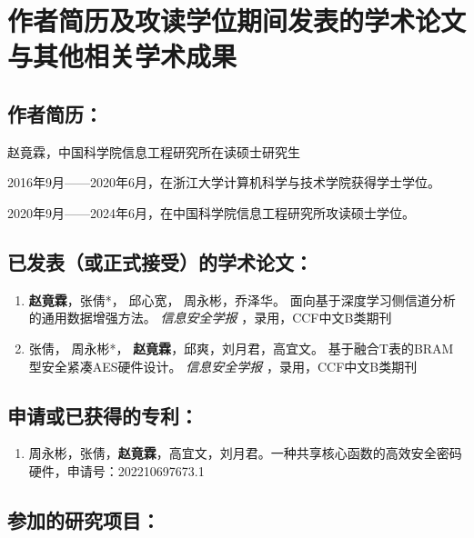 \chapter{作者简历及攻读学位期间发表的学术论文与其他相关学术成果}

\section*{作者简历：}
赵竟霖，中国科学院信息工程研究所在读硕士研究生

2016年9月——2020年6月，在浙江大学计算机科学与技术学院获得学士学位。


2020年9月——2024年6月，在中国科学院信息工程研究所攻读硕士学位。


\section*{已发表（或正式接受）的学术论文：}
{
	\setlist[enumerate]{}%
	\begin{enumerate}[nosep]
		\item \textbf{赵竟霖}，张倩*， 邱心宽， 周永彬，乔泽华。 面向基于深度学习侧信道分析的通用数据增强方法。 \textit{信息安全学报 } ，录用，CCF中文B类期刊
		\item 张倩， 周永彬*， \textbf{赵竟霖}，邱爽，刘月君，高宜文。 基于融合T表的BRAM型安全紧凑AES硬件设计。 \textit{信息安全学报 } ，录用，CCF中文B类期刊
		
	\end{enumerate}  
} 


\section*{申请或已获得的专利：}
{
	\setlist[enumerate]{}%
	\begin{enumerate}
		\item 周永彬，张倩，\textbf{赵竟霖}，高宜文，刘月君。一种共享核心函数的高效安全密码硬件，申请号：202210697673.1
		
	\end{enumerate}  
}  


\section*{参加的研究项目：}

